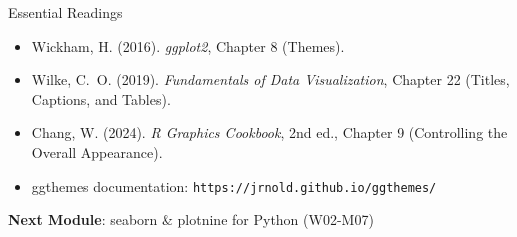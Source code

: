 \documentclass[10pt]{beamer}
\begin{document}
\begin{frame}{Essential Readings}
  \begin{itemize}
    \item Wickham, H. (2016). \emph{ggplot2}, Chapter 8 (Themes).
    \item Wilke, C.~O. (2019). \emph{Fundamentals of Data Visualization},
          Chapter 22 (Titles, Captions, and Tables).
    \item Chang, W. (2024). \emph{R Graphics Cookbook}, 2nd ed., Chapter 9
          (Controlling the Overall Appearance).
    \item ggthemes documentation: \texttt{https://jrnold.github.io/ggthemes/}
  \end{itemize}
  \vspace{6pt}
  \textbf{Next Module}: seaborn \& plotnine for Python (W02-M07)
\end{frame}
\end{document}
